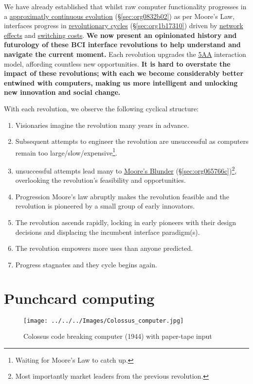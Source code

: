 \documentclass[logo,bsc,singlespacing,parskip]{infthesis}
\begin{document}
We have already established that whilst raw computer functionality progresses in a \hyperref[sec:org0832b02]{approximatly continuous evolution} (\S \ref{sec:org0832b02}) as per Moore's Law, interfaces progress in \hyperref[sec:org1b17310]{revolutionary cycles} (\S \ref{sec:org1b17310}) driven by \hyperref[network effects]{network effects} and \hyperref[switching costs]{switching costs}.
\textbf{We now present an opinionated history and futurology of these BCI interface revolutions to help understand and navigate the current moment.}
Each revolution upgrades the \hyperref[orgce96c46]{5AA} interaction model, affording countless new opportunities.
\textbf{It is hard to overstate the impact of these revolutions; with each we become considerably better entwined with computers, making us more intelligent and unlocking new innovation and social change.}

With each revolution, we observe the following cyclical structure:

\begin{enumerate}
\item Visionaries imagine the revolution many years in advance.
\item Subsequent attempts to engineer the revolution are unsuccessful as computers remain too large/slow/expensive\footnote{Waiting for Moore's Law to catch up.}.
\item unsuccessful attempts lead many to \hyperref[sec:org065766c]{Moore's Blunder} (\S \ref{sec:org065766c})\footnote{Most importantly market leaders from the previous revolution.}, overlooking the revolution's feasibility and opportunities.
\item Progression Moore's law abruptly makes the revolution feasible and the revolution is pioneered by a small group of early innovators.
\item The revolution ascends rapidly, locking in early pioneers with their design decisions and displacing the incumbent interface paradigm(s).
\item The revolution empowers more uses than anyone predicted.
\item Progress stagnates and they cycle begins again.
\end{enumerate}
\section{Punchcard computing}
\label{sec:orgb77a9e2}
\begin{wrapfigure}{r}{0.6\textwidth}
\centering
\texttt{[image: ../../../Images/Colossus\_computer.jpg]}
\caption[Colossus code breaking computer (1944)]{Colossus code breaking computer (1944) with paper-tape input}
\end{wrapfigure}
\end{document}
